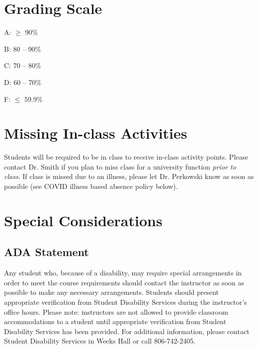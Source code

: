 \documentclass[12pt, notitlepage]{article}   	%
\begin{document}
{\section{Grading Scale}
A: $\geq$ 90\% \par
B: 80 – 90\% \par
C: 70 – 80\% \par
D: 60 – 70\% \par
F: $\leq$ 59.9\% \par

\section{Missing In-class Activities}
Students will be required to be in class to receive in-class activity points. Please contact Dr. Smith if you plan to miss class for a university function \textit{prior to class}. If class is missed due to an illness, please let Dr. Perkowski know as soon as possible (see COVID illness based absence policy below).

\section{Special Considerations}
\subsection{ADA Statement}
Any student who, because of a disability, may require special arrangements in order to meet the course requirements should contact the instructor as soon as possible to make any necessary arrangements. Students should present appropriate verification from Student Disability Services during the instructor’s office hours. Please note: instructors are not allowed to provide classroom accommodations to a student until appropriate verification from Student Disability Services has been provided. For additional information, please contact Student Disability Services in Weeks Hall or call 806-742-2405.


}
\end{document}
